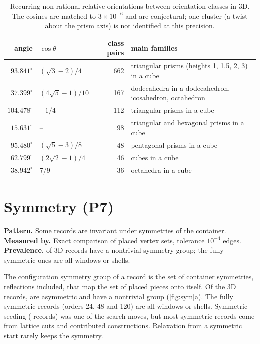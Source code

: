 \documentclass[11pt,a4paper]{article}
\begin{document}
\begin{table}[htbp]
\centering\small
\begin{tabular}{rlrl}
\toprule
angle & $\cos\theta$ & class pairs & main families \\
\midrule
$93.841^\circ$ & $(\sqrt3-2)/4$ & 662 & triangular prisms (heights 1, 1.5, 2, 3) in a cube \\
$37.399^\circ$ & $(4\sqrt5-1)/10$ & 167 & dodecahedra in a dodecahedron, icosahedron, octahedron \\
$104.478^\circ$ & $-1/4$ & 112 & triangular prisms in a cube \\
$15.631^\circ$ & -- & 98 & triangular and hexagonal prisms in a cube \\
$95.480^\circ$ & $(\sqrt5-3)/8$ & 48 & pentagonal prisms in a cube \\
$62.799^\circ$ & $(2\sqrt2-1)/4$ & 46 & cubes in a cube \\
$38.942^\circ$ & $7/9$ & 36 & octahedra in a cube \\
\bottomrule
\end{tabular}
\caption{Recurring non-rational relative orientations between orientation classes in 3D. The cosines are matched to $3\times10^{-6}$ and are conjectural; one cluster (a twist about the prism axis) is not identified at this precision.}
\label{tab:angles}
\end{table}

\section{Symmetry (P7)}\label{sec:symmetry}

\begin{summarybox}
\textbf{Pattern.} Some records are invariant under symmetries of the container.\\
\textbf{Measured by.} Exact comparison of placed vertex sets, tolerance $10^{-4}$ edges.\\
\textbf{Prevalence.} \nSymNontrivial{} of \nFeat{} 3D records have a nontrivial symmetry group; the fully symmetric ones are all windows or shells.
\end{summarybox}

The configuration symmetry group of a record is the set of container symmetries, reflections included, that map the set of placed pieces onto itself. Of the \nFeat{} 3D records, \nSymTrivial{} are asymmetric and \nSymNontrivial{} have a nontrivial group (\cref{fig:sym}a). The fully symmetric records (orders 24, 48 and 120) are all windows or shells. Symmetric seeding (\nSymfresh{} records) was one of the search moves, but most symmetric records come from lattice cuts and contributed constructions. Relaxation from a symmetric start rarely keeps the symmetry.
\end{document}

